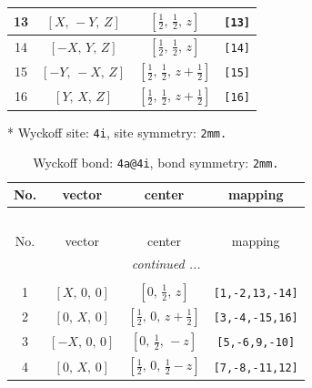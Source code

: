 \documentclass[fleqn,8pt]{jsarticle}
\begin{document}
\begin{longtable}{cccc}
13 & $\left[ X,\, - Y,\, Z \right]$ & $\left[ \frac{1}{2},\, \frac{1}{2},\, z \right]$ & {\tt [13]} \\ \hline
14 & $\left[ - X,\, Y,\, Z \right]$ & $\left[ \frac{1}{2},\, \frac{1}{2},\, z \right]$ & {\tt [14]} \\ \hline
15 & $\left[ - Y,\, - X,\, Z \right]$ & $\left[ \frac{1}{2},\, \frac{1}{2},\, z + \frac{1}{2} \right]$ & {\tt [15]} \\ \hline
16 & $\left[ Y,\, X,\, Z \right]$ & $\left[ \frac{1}{2},\, \frac{1}{2},\, z + \frac{1}{2} \right]$ & {\tt [16]} \\
\end{longtable}
* Wyckoff site: {\tt 4i}, site symmetry: {\tt 2mm.}
\renewcommand{\arraystretch}{1.2}
\begin{longtable}{cccc}
\caption{Wyckoff bond: {\tt 4a@4i}, bond symmetry: {\tt 2mm.}}
 \\
 \hline \hline
No. & vector & center & mapping \\ \hline \endfirsthead

\multicolumn{3}{l}{\tablename\ \thetable{}} \\
 \hline \hline
No. & vector & center & mapping \\ \hline \endhead

 \hline \hline
\multicolumn{3}{r}{\footnotesize\it continued ...} \\ \endfoot

 \hline \hline
\multicolumn{3}{r}{} \\ \endlastfoot

1 & $\left[ X,\, 0,\, 0 \right]$ & $\left[ 0,\, \frac{1}{2},\, z \right]$ & {\tt [1,-2,13,-14]} \\ \hline
2 & $\left[ 0,\, X,\, 0 \right]$ & $\left[ \frac{1}{2},\, 0,\, z + \frac{1}{2} \right]$ & {\tt [3,-4,-15,16]} \\ \hline
3 & $\left[ - X,\, 0,\, 0 \right]$ & $\left[ 0,\, \frac{1}{2},\, - z \right]$ & {\tt [5,-6,9,-10]} \\ \hline
4 & $\left[ 0,\, X,\, 0 \right]$ & $\left[ \frac{1}{2},\, 0,\, \frac{1}{2} - z \right]$ & {\tt [7,-8,-11,12]} \\
\end{longtable}
\renewcommand{\arraystretch}{1.2}
\end{document}
